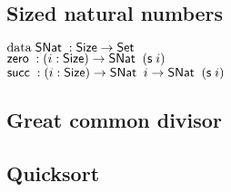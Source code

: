 \subsection{Sized natural numbers}
\begin{bsp}
$\data \SNat : \Size \ra \Set $ \\
$\zero : \EPi{i}{\Size}{ \SNat \; (\s i)} $\\
$\suc : \EPi{i}{\Size}{ \SNat \; i \ra \SNat \; (\s i)} $
\end{bsp}

\subsection{Great common divisor}

\subsection{Quicksort}
